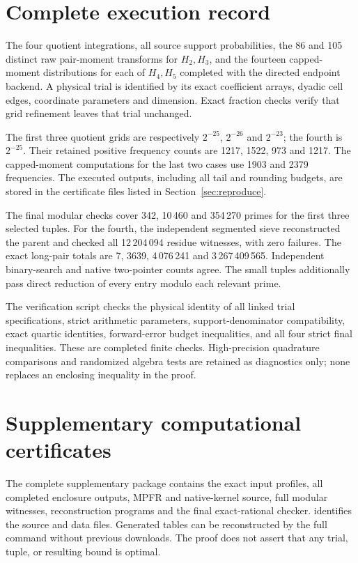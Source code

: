 \documentclass[11pt,a4paper]{article}
\theoremstyle{definition}\newtheorem{definition}[theorem]{Definition}
\theoremstyle{remark}\newtheorem{remark}[theorem]{Remark}
\numberwithin{equation}{section}
\begin{document}
\section{Complete execution record}\label{sec:audit}
The four quotient integrations, all source support probabilities, the 86 and 105 distinct raw pair-moment transforms for $H_2,H_3$, and the fourteen capped-moment distributions for each of $H_4,H_5$ completed with the directed endpoint backend. A physical trial is identified by its exact coefficient arrays, dyadic cell edges, coordinate parameters and dimension. Exact fraction checks verify that grid refinement leaves that trial unchanged.

The first three quotient grids are respectively $2^{-25}$, $2^{-26}$ and $2^{-23}$; the fourth is $2^{-25}$. Their retained positive frequency counts are 1217, 1522, 973 and 1217. The capped-moment computations for the last two cases use 1903 and 2379 frequencies. The executed outputs, including all tail and rounding budgets, are stored in the certificate files listed in Section~\ref{sec:reproduce}.

The final modular checks cover 342, 10\,460 and 354\,270 primes for the first three selected tuples. For the fourth, the independent segmented sieve reconstructed the parent and checked all 12\,204\,094 residue witnesses, with zero failures. The exact long-pair totals are 7, 3639, 4\,076\,241 and 3\,267\,409\,565. Independent binary-search and native two-pointer counts agree. The small tuples additionally pass direct reduction of every entry modulo each relevant prime.

The verification script checks the physical identity of all linked trial specifications, strict arithmetic parameters, support-denominator compatibility, exact quartic identities, forward-error budget inequalities, and all four strict final inequalities. These are completed finite checks. High-precision quadrature comparisons and randomized algebra tests are retained as diagnostics only; none replaces an enclosing inequality in the proof.

\section{Supplementary computational certificates}
The complete supplementary package contains the exact input profiles, all completed enclosure outputs, MPFR and native-kernel source, full modular witnesses, reconstruction programs and the final exact-rational checker.  identifies the source and data files. Generated tables can be reconstructed by the full command without previous downloads. The proof does not assert that any trial, tuple, or resulting bound is optimal.
\end{document}
